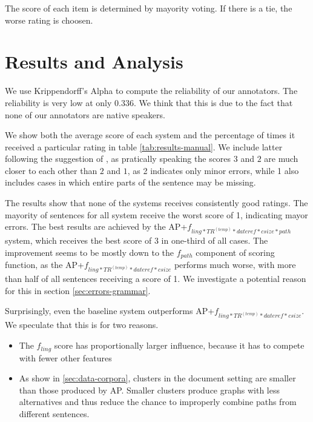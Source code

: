 \documentclass[a4paper,BCOR=10mm]{report}
\numberwithin{lemma}{chapter}
\numberwithin{definition}{chapter}
\begin{document}
The score of each item is determined by mayority voting. If there is a tie, the worse rating is choosen.

\section{Results and Analysis}

We use Krippendorff's Alpha \citet{krippendorff} to compute the reliability of our annotators.
The reliability is very low at only $0.336$. We think that this is due to the fact that none of our annotators are native speakers.

We show both the average score of each system and the percentage of times it received a particular rating in table \ref{tab:results-manual}.
We include latter following the suggestion of \citet{filippova}, as pratically speaking the scores $3$ and $2$ are much closer to each other than $2$ and $1$, as 2 indicates only minor errors, while 1 also includes cases in which entire parts of the sentence may be missing.

The results show that none of the systems receives consistently good ratings. The mayority of sentences for all system receive the worst score of 1, indicating mayor errors.
The best results are achieved by the AP+$f_{ ling*TR^{(temp)}*\mathit{dateref}*\mathit{csize}*\mathit{path} }$ system, which receives the best score of 3 in one-third of all cases. The improvement seems to be mostly down to the $f_{path}$ component of scoring function, as the AP+$f_{ ling*TR^{(temp)}*\mathit{dateref}*\mathit{csize}}$ performs much worse, with more than half of all sentences receiving a score of 1.
We investigate a potential reason for this in section \ref{sec:errors-grammar}.

Surprisingly, even the baseline system outperforms AP+$f_{ ling*TR^{(temp)}*\mathit{dateref}*\mathit{csize}}$. We speculate that this is for two reasons.

\begin{itemize}
    \item{The $f_{ling}$ score has proportionally larger influence, because it has to compete with fewer other features}
    \item{As show in \ref{sec:data-corpora}, clusters in the document setting are smaller than those produced by AP. Smaller clusters produce graphs with less alternatives and thus reduce the chance to improperly combine paths from different sentences.}
\end{itemize}
\end{document}
